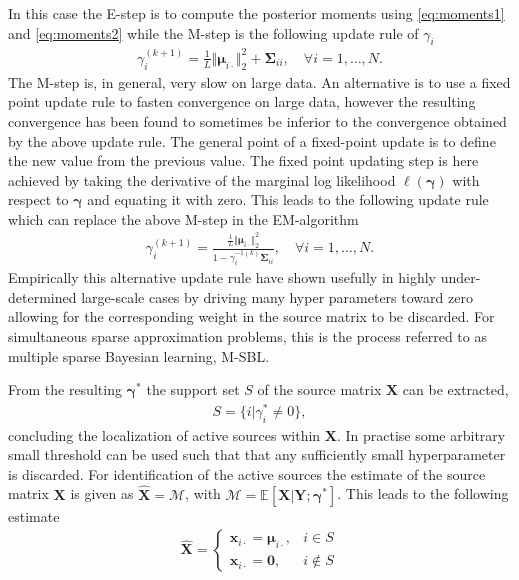 In this case the E-step is to compute the posterior moments using \eqref{eq:moments1} and \eqref{eq:moments2} while the M-step is the following update rule of $\gamma_i$ \cite[p.147]{phd_wipf}
\begin{align*}
\gamma_i^{(k+1)} = \frac{1}{L} \Vert \boldsymbol{\mu}_{i \cdot} \Vert_2^2 + \boldsymbol{\Sigma}_{ii}, \quad \forall i = 1, \dots, N.
\end{align*}
The M-step is, in general, very slow on large data. 
An alternative is to use a fixed point update rule to fasten convergence on large data, however the resulting convergence has been found to sometimes be inferior to the convergence obtained by the above update rule\cite[p.147]{phd_wipf}. The general point of a fixed-point update is to define the new value from the previous value. 
The fixed point updating step is here achieved by taking the derivative of the marginal log likelihood $\ell(\boldsymbol{\gamma})$ with respect to $\boldsymbol{\gamma}$ and equating it with zero. 
This leads to the following update rule which can replace the above M-step in the EM-algorithm \cite[p.147]{phd_wipf}
\begin{align}
\gamma_i^{(k+1)} = \frac{\frac{1}{L} \Vert \boldsymbol{\mu}_{i \cdot} \Vert_2^2}{1 - \gamma_i^{-1 (k)} \boldsymbol{\Sigma}_{ii}}, \quad \forall i = 1, \dots, N.
\end{align}
Empirically this alternative update rule have shown usefully in highly under-determined large-scale cases by driving many hyper parameters toward zero allowing for the corresponding weight in the source matrix to be discarded. 
For simultaneous sparse approximation problems, this is the process referred to as multiple sparse Bayesian learning, M-SBL.

From the resulting $\boldsymbol{\gamma}^\ast$ the support set $S$ of the source matrix $\mathbf{X}$ can be extracted, 
\begin{align*}
S = \{ i \vert \gamma_i^{\ast} \neq 0 \},
\end{align*}
concluding the localization of active sources within $\mathbf{X}$. 
In practise some arbitrary small threshold can be used such that that any sufficiently small hyperparameter is discarded\cite[p.149]{phd_wipf}.
For identification of the active sources the estimate of the source matrix $\mathbf{X}$ is given as $\hat{\mathbf{X}} = \mathcal{M} $, with $\mathcal{M} = \mathbb{E}[\mathbf{X}\vert \mathbf{Y} ; \boldsymbol{\gamma}^{\ast}]$. 
This leads to the following estimate  
\begin{align*}
\hat{\mathbf{X}} = 
\begin{cases}
\mathbf{x}_{i\cdot} = \boldsymbol{\mu}_{i \cdot}, & i \in S \\
\mathbf{x}_{i\cdot} = \mathbf{0}, & i \not \in S
\end{cases}
\end{align*}


